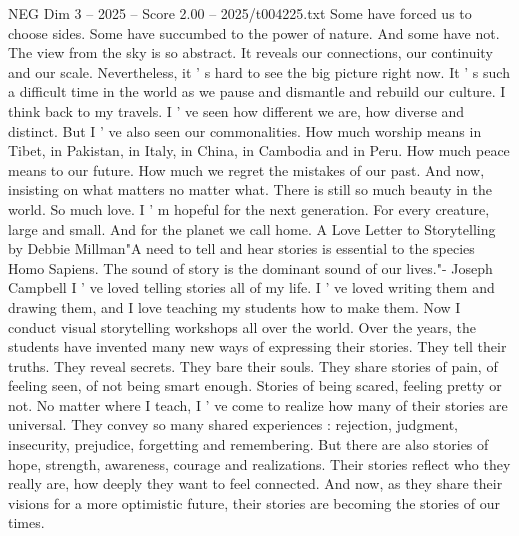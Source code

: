 \begin{textsample}{NEG Dim 3 – 2025 – Score 2.00 – 2025/t004225.txt}
Some have forced us to choose sides.
Some have succumbed to the power of nature.
And some have not.
The view from the sky is so abstract.
It reveals our connections, our continuity and our scale.
Nevertheless, it ' s hard to see the big picture right now.
It ' s such a difficult time in the world as we pause and dismantle and rebuild our culture.
I think back to my travels.
I ' ve seen how different we are, how diverse and distinct.
But I ' ve also seen our commonalities.
How much worship means in Tibet, in Pakistan, in Italy, in China, in Cambodia and in Peru.
How much peace means to our future.
How much we regret the mistakes of our past.
And now, insisting on what matters no matter what.
There is still so much beauty in the world.
So much love.
I ' m hopeful for the next generation.
For every creature, large and small.
And for the planet we call home.
A Love Letter to Storytelling by Debbie Millman"A need to tell and hear stories is essential to the species Homo Sapiens.
The sound of story is the dominant sound of our lives."- Joseph Campbell I ' ve loved telling stories all of my life.
I ' ve loved writing them and drawing them, and I love teaching my students how to make them.
Now I conduct visual storytelling workshops all over the world.
Over the years, the students have invented many new ways of expressing their stories.
They tell their truths.
They reveal secrets.
They bare their souls.
They share stories of pain, of feeling seen, of not being smart enough.
Stories of being scared, feeling pretty or not.
No matter where I teach, I ' ve come to realize how many of their stories are universal.
They convey so many shared experiences : rejection, judgment, insecurity, prejudice, forgetting and remembering.
But there are also stories of hope, strength, awareness, courage and realizations.
Their stories reflect who they really are, how deeply they want to feel connected.
And now, as they share their visions for a more optimistic future, their stories are becoming the stories of our times.

\end{textsample}
